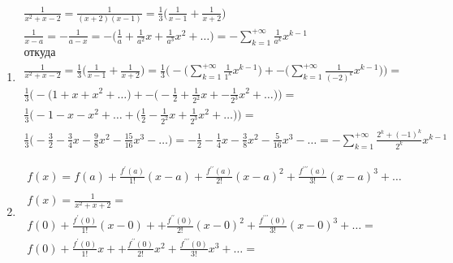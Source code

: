 
		\subsection{}
		\begin{enumerate}
		\item
			\begin{gather*}
				\frac{1}{x^2 + x - 2} = \frac{1}{(x + 2)(x - 1)} = \frac{1}{3} \Big( \frac{1}{x - 1} + \frac{1}{x + 2} \Big)\\
				\frac{1}{x - a} = - \frac{1}{a - x} = - \Big( \frac{1}{a} + \frac{1}{a^2}x + \frac{1}{a^3}x^2 + \ldots \Big) = - \sum_{k = 1}^{ + \infty} \frac{1}{a^k}x^{k - 1}\\
				\text{откуда}\\
				\frac{1}{x^2 + x - 2} = 
				\frac{1}{3} \Big( \frac{1}{x - 1} + \frac{1}{x + 2} \Big) = 
				\frac{1}{3} \Big( - \Big( \sum_{k = 1}^{ + \infty} \frac{1}{1^k}x^{k - 1} \Big) + - \Big( \sum_{k = 1}^{ + \infty} \frac{1}{( - 2)^k}x^{k - 1} \Big) \Big) = \\
				\frac{1}{3} \Big( - \Big( 1 + x + x^2 + \ldots \Big) + - \Big( - \frac{1}{2} + \frac{1}{2^2}x + - \frac{1}{2^3}x^2 + \ldots \Big) \Big) = \\
				\frac{1}{3} \Big( - 1 - x - x^2 + \ldots + \Big( \frac{1}{2} - \frac{1}{2^2}x + \frac{1}{2^3}x^2 + \ldots \Big) \Big) = \\
				\frac{1}{3} \Big( - \frac{3}{2} - \frac{3}{4}x - \frac{9}{8}x^2 - \frac{15}{16}x^3 - \ldots \Big) = - \frac{1}{2} - \frac{1}{4}x - \frac{3}{8}x^2 - \frac{5}{16}x^3 - \ldots = - \sum_{k = 1}^{ + \infty} \frac{2^k + ( - 1)^{k}}{2^k}x^{k - 1}
			\end{gather*} 
		\item 
			\begin{gather*}
				f(x) = f(a) + \frac{f^{\prime}(a)}{1!}(x - a) + \frac{f^{\prime\prime}(a)}{2!}(x - a)^2 + \frac{f^{\prime\prime\prime}(a)}{3!}(x - a)^3 + \ldots\\
				\\
				f(x) = \frac{1}{x^2 + x + 2} = \\
				f(0) + \frac{f^{\prime}(0)}{1!}(x - 0) +  + \frac{f^{\prime\prime}(0)}{2!}(x - 0)^2 + \frac{f^{\prime\prime\prime}(0)}{3!}(x - 0)^3 + \ldots = \\
				f(0) + \frac{f^{\prime}(0)}{1!}x +  + \frac{f^{\prime\prime}(0)}{2!}x^2 + \frac{f^{\prime\prime\prime}(0)}{3!}x^3 + \ldots = \\

\end{gather*}
\end{enumerate}
